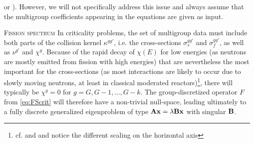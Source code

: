 \cite[Chap.~5]{Cacuci1} or \cite{Cho1}). However, we will not specifically address this issue and always assume that 
the multigroup coefficients appearing in the equations are given as input.
\begin{remark}{\textsc{Fission spectrum}}
In criticality problems, the set of multigroup data must include both parts of the collision kernel
$\kappa^{gg'}$, i.e. the cross-sections $\sigma_s^{gg'}$ and $\sigma_f^{gg'}$, as well as $\nu^{g'}$ and
$\chi^g$. Because of the rapid
decay of $\chi(E)$ for low energies (as neutrons are mostly emitted from fission with high energies) that are
nevertheless the most important for the cross-sections (as most interactions are likely to occur due to slowly moving
neutrons, at least in classical moderated reactors)\footnote{cf.  and  and notice the
different scaling on the horizontal axis}, there will typically be $\chi^g = 0$ for $g = G,G-1,\ldots,G-k$. The
group-discretized operator $F$ from \eqref{eq:FScrit} will therefore have a non-trivial null-space, leading ultimately
to a fully discrete generalized eigenproblem of type $\mathbf{A}\mathbf{x} = \lambda\mathbf{B}\mathbf{x}$ with singular $\mathbf{B}$.
\end{remark}


